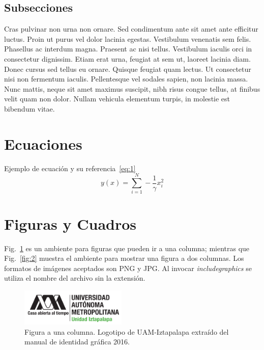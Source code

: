 \documentclass[conference]{IEEEtran}
\begin{document}
\subsection{Subsecciones}
Cras pulvinar non urna non ornare. Sed condimentum ante sit amet ante efficitur luctus. Proin ut purus vel dolor lacinia egestas. Vestibulum venenatis sem felis. Phasellus ac interdum magna. Praesent ac nisi tellus. Vestibulum iaculis orci in consectetur dignissim. Etiam erat urna, feugiat at sem ut, laoreet lacinia diam. Donec cursus sed tellus eu ornare. Quisque feugiat quam lectus. Ut consectetur nisi non fermentum iaculis. Pellentesque vel sodales sapien, non lacinia massa. Nunc mattis, neque sit amet maximus suscipit, nibh risus congue tellus, at finibus velit quam non dolor. Nullam vehicula elementum turpis, in molestie est bibendum vitae.

\section{Ecuaciones}
Ejemplo de ecuación y su referencia~\eqref{eq:1}
\begin{equation}
y(x) = \sum_{i=1}^N -\dfrac{1}{\gamma} x_i^2 \label{eq:1}
\end{equation}


\section{Figuras y Cuadros}\label{FAT}
Fig.~\ref{fig:1} es un ambiente para figuras que pueden ir a una columna; mientras que Fig.~\ref{fig:2} muestra el ambiente para mostrar una figura a dos columnas. Los formatos de imágenes aceptados son PNG y JPG. Al invocar \textit{includegraphics} se utiliza el nombre del archivo sin la extensión.

\begin{figure}[htbp]
\centering
\includegraphics[width=0.45\textwidth]{fig1}
\caption{Figura a una columna. Logotipo de UAM-Iztapalapa extraído del manual de identidad gráfica 2016.}
\label{fig:1}
\end{figure}
\end{document}
